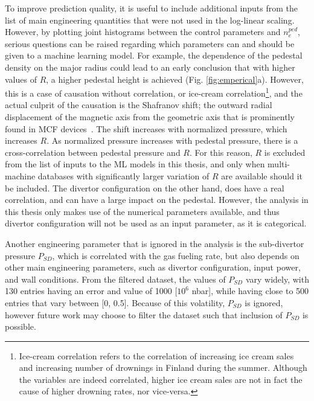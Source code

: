 \documentclass[a4paper, twoside, final, 12pt]{article}
\begin{document}
To improve prediction quality, it is useful to include additional inputs from the list of main engineering quantities that were not used in the log-linear scaling.
However, by plotting joint histograms between the control parameters and $n_e^{ped}$, serious questions can be raised regarding which parameters can and should be given to a machine learning model.
For example, the dependence of the pedestal density on the major radius could lead to an early conclusion that with higher values of $R$, a higher pedestal height is achieved (Fig. \ref{fig:emperical}a). 
However, this is a case of causation without correlation, or ice-cream correlation\footnote{Ice-cream correlation refers to the correlation of increasing ice cream sales and increasing number of drownings in Finland during the summer. Although the variables are indeed correlated, higher ice cream sales are not in fact the cause of higher drowning rates, nor vice-versa.}, and the actual culprit of the causation is the Shafranov shift; the outward radial displacement of the magnetic axis from the geometric axis that is prominently found in MCF devices~\cite{shafranov_equilibrium_1963, freidberg_plasma_2007}. The shift increases with normalized pressure, which increases $R$. As normalized pressure increases with pedestal pressure, there is a cross-correlation between pedestal pressure and $R$. For this reason, $R$ is excluded from the list of inputs to the ML models in this thesis, and only when multi-machine databases with significantly larger variation of $R$ are available should it be included.
The divertor configuration on the other hand, does have a real correlation, and can have a large impact on the pedestal. However, the analysis in this thesis only makes use of the numerical parameters available, and thus divertor configuration will not be used as an input parameter, as it is categorical.  

Another engineering parameter that is ignored in the analysis is the sub-divertor pressure $P_{SD}$, which is correlated with the gas fueling rate, but also depends on other main engineering parameters, such as divertor configuration, input power, and wall conditions.
From the filtered dataset, the values of $P_{SD}$ vary widely, with 130 entries having an error and value of 1000 [$10^6$ nbar], while having close to 500 entries that vary between [0, 0.5].
Because of this volatility, $P_{SD}$ is ignored, however future work may choose to filter the dataset such that inclusion of $P_{SD}$ is possible.
\end{document}
